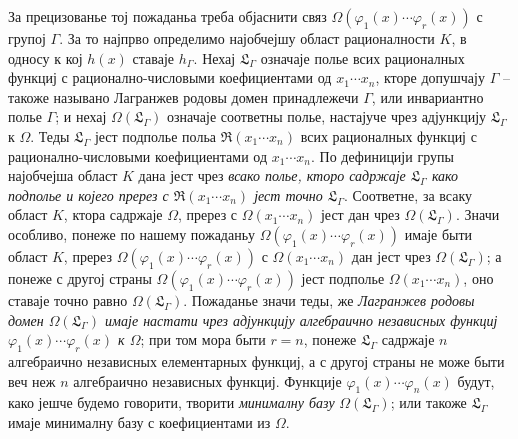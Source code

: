 ﻿\documentclass[11pt]{article}
\begin{document}
За прецизованье тој пожаданьа треба објаснити связ $\Omega(\varphi_1(x)\cdots\varphi_r(x))$ с групој $\Gamma$. За то најпрво определимо најобчејшу област рационалности $K$, в односу к кој $h(x)$ ставаје $h_\Gamma$. Нехај $\mathfrak L_\Gamma$ означаје полье всих рационалных функциј с рационално-числовыми коефициентами од $x_1\cdots x_n$, кторе допушчају $\Gamma$ -- такоже называно Лагранжев родовы домен принадлежечи $\Gamma$, или инвариантно полье $\Gamma$; и нехај $\Omega(\mathfrak L_\Gamma)$ означаје соответны полье, настајуче чрез адјункцију $\mathfrak L_\Gamma$ к $\Omega$. Теды $\mathfrak L_\Gamma$ јест подполье польа $\mathfrak R(x_1\cdots x_n)$ всих рационалных функциј с рационално-числовыми коефициентами од $x_1\cdots x_n$. По дефиницији групы најобчејша област $K$ дана јест чрез {\itshape всако полье, кторо садржаје $\mathfrak L_\Gamma$ како подполье и којего пререз с $\mathfrak R(x_1\cdots x_n)$ јест точно $\mathfrak L_\Gamma$}. Соответне, за всаку област $K$, ктора садржаје $\Omega$, пререз с $\Omega(x_1\cdots x_n)$ јест дан чрез $\Omega(\mathfrak L_\Gamma)$. Значи особливо, понеже по нашему пожаданьу $\Omega(\varphi_1(x)\cdots\varphi_r(x))$ имаје быти област $K$, пререз $\Omega(\varphi_1(x)\cdots\varphi_r(x))$ с $\Omega(x_1\cdots x_n)$ дан јест чрез $\Omega(\mathfrak L_\Gamma)$; а понеже с другој страны $\Omega(\varphi_1(x)\cdots\varphi_r(x))$ јест подполье $\Omega(x_1\cdots x_n)$, оно ставаје точно равно $\Omega(\mathfrak L_\Gamma)$. Пожаданье значи теды, же {\itshape Лагранжев родовы домен $\Omega(\mathfrak L_\Gamma)$ имаје настати чрез адјункцију алгебраично независных функциј $\varphi_1(x)\cdots\varphi_r(x)$ к $\Omega$}; при том мора быти $r=n$, понеже $\mathfrak L_\Gamma$ садржаје $n$ алгебраично независных елементарных функциј, а с другој страны не може быти веч неж $n$ алгебраично независных функциј. Функције $\varphi_1(x)\cdots\varphi_n(x)$ будут, како јешче будемо говорити, творити {\itshape минималну базу} $\Omega(\mathfrak L_\Gamma)$; или такоже $\mathfrak L_\Gamma$ имаје минималну базу с коефициентами из $\Omega$.
\end{document}
